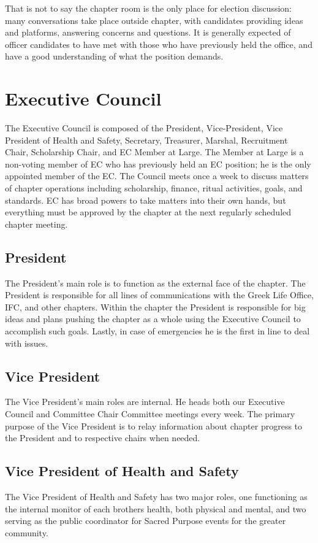     That is not to say the chapter room is the only place for election discussion: many conversations take place outside chapter, with candidates providing ideas and platforms, answering concerns and questions. It is generally expected of officer candidates to have met with those who have previously held the office, and have a good understanding of what the position demands.
    
    \section*{Executive Council}
      The Executive Council is composed of the President, Vice-President, Vice President of Health and Safety, Secretary, Treasurer, Marshal, Recruitment Chair, Scholarship Chair, and EC Member at Large. The Member at Large is a non-voting member of EC who has previously held an EC position; he is the only appointed member of the EC. The Council meets once a week to discuss matters of chapter operations including scholarship, finance, ritual activities, goals, and standards. EC has broad powers to take matters into their own hands, but everything must be approved by the chapter at the next regularly scheduled chapter meeting.
      
      \subsection*{President}
	The President's main role is to function as the external face of the chapter. The President is responsible for all lines of communications with the Greek Life Office, IFC, and other chapters. Within the chapter the President is responsible for big ideas and plans pushing the chapter as a whole using the Executive Council to accomplish such goals. Lastly, in case of emergencies he is the first in line to deal with issues.
	
      \subsection*{Vice President}
	The Vice President's main roles are internal. He heads both our Executive Council and Committee Chair Committee meetings every week. The primary purpose of the Vice President is to relay information about chapter progress to the President and to respective chairs when needed.
	
      \subsection*{Vice President of Health and Safety}
	The Vice President of Health and Safety has two major roles, one functioning as the internal monitor of each brothers health, both physical and mental, and two serving as the public coordinator for Sacred Purpose events for the greater community.
	
